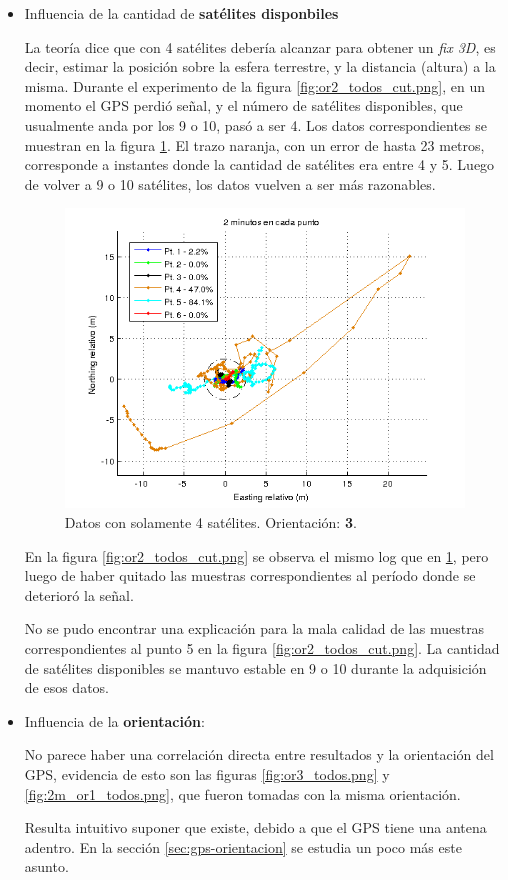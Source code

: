 \documentclass[spanish,12pt,a4paper,titlepage]{report}
\begin{document}
\begin{itemize}
\item Influencia de la cantidad de \textbf{satélites disponbiles}

La teoría dice que con 4 satélites debería alcanzar para obtener un \textit{fix 3D}, es decir, estimar la posición sobre la esfera terrestre, y la distancia (altura) a la misma. Durante el experimento de la figura \ref{fig:or2_todos_cut.png}, en un momento el GPS perdió señal, y el número de satélites disponibles, que usualmente anda por los 9 o 10, pasó a ser 4. Los datos correspondientes se muestran en la figura \ref{fig:or2_todos_sat_mal.png}. El trazo naranja, con un error de hasta 23 metros, corresponde a instantes donde la cantidad de satélites era entre 4 y 5. Luego de volver a 9 o 10 satélites, los datos vuelven a ser más razonables.

\begin{figure}[h!]
  \includegraphics[width=1\textwidth]{./img/or2_todos_sat_mal.png}
  \caption{Datos con solamente 4 satélites. Orientación: \textbf{3}.}
  \label{fig:or2_todos_sat_mal.png}
\end{figure}

En la figura \ref{fig:or2_todos_cut.png} se observa el mismo log que en \ref{fig:or2_todos_sat_mal.png}, pero luego de haber quitado las muestras correspondientes al período donde se deterioró la señal.

No se pudo encontrar una explicación para la mala calidad de las muestras correspondientes al punto 5 en la figura \ref{fig:or2_todos_cut.png}. La cantidad de satélites disponibles se mantuvo estable en 9 o 10 durante la adquisición de esos datos.
\item Influencia de la \textbf{orientación}:

No parece haber una correlación directa entre resultados y la orientación del GPS, evidencia de esto son las figuras \ref{fig:or3_todos.png} y \ref{fig:2m_or1_todos.png}, que fueron tomadas con la misma orientación.

Resulta  intuitivo suponer que existe, debido a que el GPS tiene una antena adentro. En la sección \ref{sec:gps-orientacion} se estudia un poco más este asunto.
\end{itemize}
\end{document}
